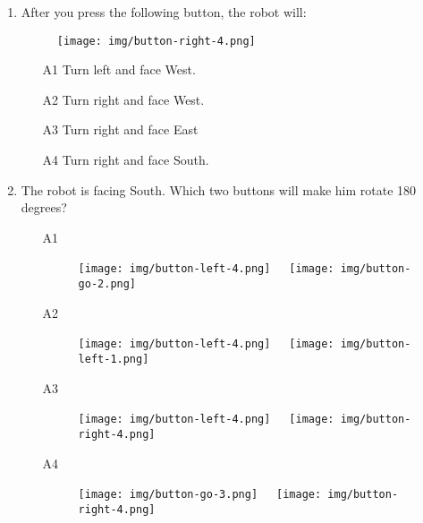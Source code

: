 \begin{enumerate}
\item After you press the following button, the robot will:

\begin{figure}[!ht]
\begin{center}
\texttt{[image: img/button-right-4.png]}
\end{center}
\end{figure}
\begin{enumerate}
\item[A1] Turn left and face West.
\item[A2] Turn right and face West.
\item[A3] Turn right and face East
\item[A4] Turn right and face South.
\end{enumerate}
\newpage
\item The robot is facing South. Which two buttons will make him rotate 180 degrees?

\begin{enumerate}
\item[A1] 
\begin{figure}[!ht]
\begin{center}
\texttt{[image: img/button-left-4.png]}\ \ \
\texttt{[image: img/button-go-2.png]}
\end{center}
\end{figure}
\item[A2] 
\begin{figure}[!ht]
\begin{center}
\texttt{[image: img/button-left-4.png]}\ \ \
\texttt{[image: img/button-left-1.png]}
\end{center}
\end{figure}
\item[A3] 
\begin{figure}[!ht]
\begin{center}
\texttt{[image: img/button-left-4.png]}\ \ \
\texttt{[image: img/button-right-4.png]}
\end{center}
\end{figure}
\item[A4] 
\begin{figure}[!ht]
\begin{center}
\texttt{[image: img/button-go-3.png]}\ \ \
\texttt{[image: img/button-right-4.png]}
\end{center}
\end{figure}
\end{enumerate}
\end{enumerate}

